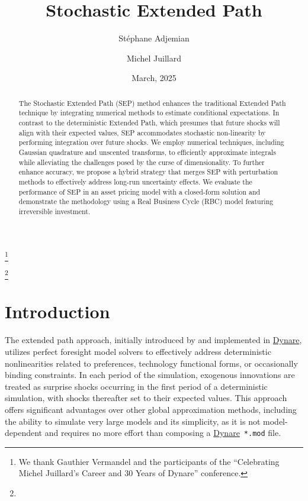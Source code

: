 \documentclass[a4paper,11pt]{amsart}
\newcommand{\Dynare}{\href{http://www.dynare.org}{Dynare}}
\begin{document}
\author[S. Adjemian]{Stéphane Adjemian}\address{Université du Mans and Dynare team}
\author[M. Juillard]{Michel Juillard}\address{Dynare team}
\thanks{We thank Gauthier Vermandel and the participants of the “Celebrating Michel Juillard’s Career and 30 Years of Dynare”
   conference.}

\title[Stochastic Extended Path]{Stochastic Extended Path}\thanks{}
\date{March, 2025}

\maketitle

\begin{abstract}
   The Stochastic Extended Path (SEP) method enhances the traditional
   Extended Path technique by integrating numerical methods to estimate
   conditional expectations. In contrast to the deterministic Extended
   Path, which presumes that future shocks will align with their
   expected values, SEP accommodates stochastic non-linearity by
   performing integration over future shocks. We employ numerical
   techniques, including Gaussian quadrature and unscented transforms,
   to efficiently approximate integrals while alleviating the
   challenges posed by the curse of dimensionality. To further enhance
   accuracy, we propose a hybrid strategy that merges SEP with
   perturbation methods to effectively address long-run uncertainty
   effects. We evaluate the performance of SEP in an asset pricing
   model with a closed-form solution and demonstrate the methodology
   using a Real Business Cycle (RBC) model featuring irreversible
   investment.
\end{abstract}

\section*{Introduction}

The extended path approach, initially introduced by
\textcite{FairTaylor1983} and implemented in \Dynare, utilizes perfect
foresight model solvers to effectively address deterministic
nonlinearities related to preferences, technology functional forms, or
occasionally binding constraints. In each period of the simulation,
exogenous innovations are treated as surprise shocks occurring in the
first period of a deterministic simulation, with shocks thereafter set
to their expected values. This approach offers significant advantages
over other global approximation methods, including the ability to
simulate very large models and its simplicity, as it is not
model-dependent and requires no more effort than composing a \Dynare\,
\verb+*.mod+ file.\newline
\end{document}
